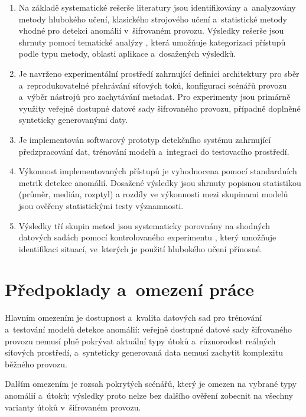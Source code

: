 \begin{enumerate}
\item Na základě systematické rešerše literatury jsou identifikovány a~analyzovány metody hlubokého učení, klasického strojového učení a~statistické metody vhodné pro detekci anomálií v~šifrovaném provozu. Výsledky rešerše jsou shrnuty pomocí tematické analýzy \parencite{Braun2006}, která umožňuje kategorizaci přístupů podle typu metody, oblasti aplikace a~dosažených výsledků.
\item Je navrženo experimentální prostředí zahrnující definici architektury pro sběr a~reprodukovatelné přehrávání síťových toků, konfiguraci scénářů provozu a~výběr nástrojů pro zachytávání metadat. Pro experimenty jsou primárně využity veřejně dostupné datové sady šifrovaného provozu, případně doplněné synteticky generovanými daty.
\item Je implementován softwarový prototyp detekčního systému zahrnující předzpracování dat, trénování modelů a~integraci do testovacího prostředí.
\item Výkonnost implementovaných přístupů je vyhodnocena pomocí standardních metrik detekce anomálií. Dosažené výsledky jsou shrnuty popisnou statistikou (průměr, medián, rozptyl) a rozdíly ve výkonnosti mezi skupinami modelů jsou ověřeny statistickými testy významnosti.
\item Výsledky tří skupin metod jsou systematicky porovnány na shodných datových sadách pomocí kontrolovaného experimentu \parencite{Wohlin2012}, který umožňuje identifikaci situací, ve~kterých je použití hlubokého učení přínosné.
\end{enumerate}

\section*{Předpoklady a~omezení práce}

Hlavním omezením je dostupnost a~kvalita datových sad pro trénování a~testování modelů detekce anomálií: veřejně dostupné datové sady šifrovaného provozu nemusí plně pokrývat aktuální typy útoků a~různorodost reálných síťových prostředí, a~synteticky generovaná data nemusí zachytit komplexitu běžného provozu.

Dalším omezením je rozsah pokrytých scénářů, který je omezen na vybrané typy anomálií a~útoků; výsledky proto nelze bez dalšího ověření zobecnit na všechny varianty útoků v~šifrovaném provozu.

